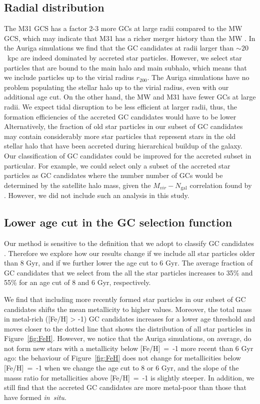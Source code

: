 \documentclass[a4paper,fleqn,usenatbib]{mnras}
\begin{document}
\subsection{Radial distribution}
\label{sec:discussion_Rgc}
The M31 GCS has a factor 2-3 more GCs at large radii compared to the MW GCS,
which may indicate that M31 has a richer merger history than the MW 
\citep{2016ApJ...824...42C}. In the Auriga simulations we find that the GC 
candidates at radii larger than ${\sim}20$~kpc are indeed dominated by accreted
star particles. However, we select star particles that are bound to the main 
halo and main subhalo, which means that we include particles up to the virial 
radius $r_{200}$. The Auriga simulations have no problem populating the stellar 
halo up to the virial radius, even with our additional age cut. On the other hand, 
the MW and M31 have fewer GCs at large radii. We expect tidal disruption to be
less efficient at larger radii, thus, the formation efficiencies of the accreted 
GC candidates would have to be lower Alternatively, the fraction of old star 
particles in our subset of GC candidates may contain considerably more star 
particles that represent stars in the old stellar halo that have been accreted
during hierarchical buildup of the galaxy. Our classification of GC candidates 
could be improved for the accreted subset in particular. For example, we could 
select only a subset of the accreted star particles as GC candidates where the 
number number of GCs would be determined by the satellite halo mass, given the 
$M_{vir}-N_{\text{gal}}$ correlation found by \citet{2020AJ....159...56B}. However,
we did not include such an analysis in this study.

\subsection{Lower age cut in the GC selection function}
\label{sec:age_min}
Our method is sensitive to the definition that we adopt to classify GC candidates
\citep[e.g.][]{2018RSPSA.47470616F}. Therefore we explore how our results change if we 
include all star particles older than 8 Gyr, and if we further lower the age cut 
to 6 Gyr. The average fraction of GC candidates that we select from the all the
star particles increases to 35\% and 55\% for an age cut of 8 and 6 Gyr, respectively.

We find that including more recently formed star particles in our subset 
of GC candidates shifts the mean metallicity to higher values. Moreover, the
total mass in metal-rich ([Fe/H] > -1) GC candidates increases for a lower age 
threshold and moves closer to the dotted line that shows the distribution of
all star particles in Figure~\ref{fig:FeH}. However, 
we notice that the Auriga simulations, on average, do not form new stars with 
a metallicity below [Fe/H]~=~-1 more recent than 6 Gyr ago: the behaviour of 
Figure~\ref{fig:FeH} does not change for metallicities below [Fe/H]~=~-1 when 
we change the age cut to 8 or 6 Gyr, and the slope of the masss ratio for 
metallicities above [Fe/H]~=~-1 is slightly steeper. In addition, we still find
that the accreted GC candidates are more metal-poor than those that have formed 
{\it in~situ}. 
\end{document}
